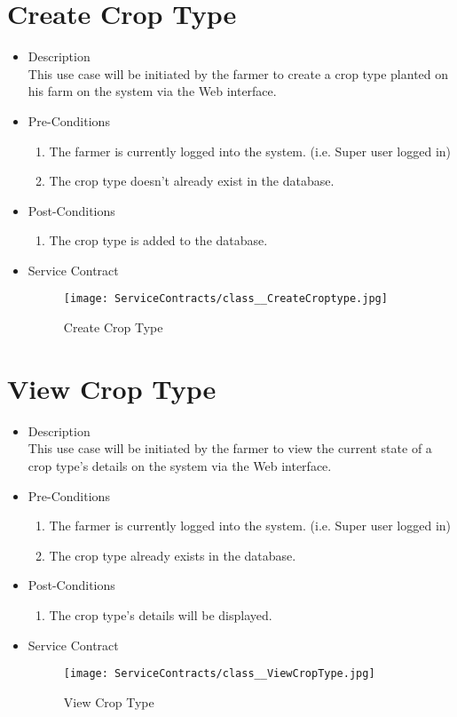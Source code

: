 \documentclass[11pt,fleqn]{book} %
\begin{document}
\section{Create Crop Type}
\begin{itemize}
	\item Description\\
	This use case will be initiated by the farmer to create a crop type planted on his farm on the system via the Web interface.
	\item Pre-Conditions
	\begin{enumerate}
		\item The farmer is currently logged into the system. (i.e. Super user logged in)
		\item The crop type doesn’t already exist in the database. 
	\end{enumerate}
	\item Post-Conditions
	\begin{enumerate}
		\item The crop type is added to the database.
	\end{enumerate}
	\item Service Contract
	\begin{figure}
		\texttt{[image: ServiceContracts/class\_\_CreateCroptype.jpg]}
		\caption{Create Crop Type}
	\end{figure}
\end{itemize}

\section{View Crop Type}
\begin{itemize}
	\item Description\\
	This use case will be initiated by the farmer to view the current state of a crop type’s details on the system via the Web interface.
	\item Pre-Conditions
	\begin{enumerate}
		\item The farmer is currently logged into the system. (i.e. Super user logged in)
		\item The crop type already exists in the database.			
	\end{enumerate}
	\item Post-Conditions
	\begin{enumerate}
		\item The crop type’s details will be displayed.
	\end{enumerate}
	\item Service Contract
	\begin{figure}
		\texttt{[image: ServiceContracts/class\_\_ViewCropType.jpg]}
		\caption{View Crop Type}
	\end{figure}
\end{itemize}
\end{document}
